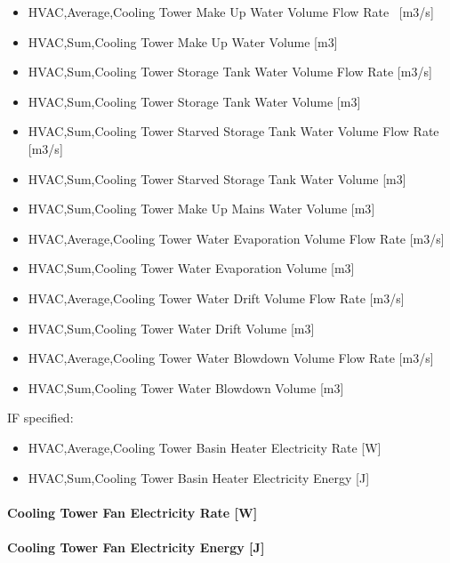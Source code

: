 \begin{itemize}
\item
  HVAC,Average,Cooling Tower Make Up Water Volume Flow Rate~ {[}m3/s{]}
\item
  HVAC,Sum,Cooling Tower Make Up Water Volume {[}m3{]}
\item
  HVAC,Sum,Cooling Tower Storage Tank Water Volume Flow Rate {[}m3/s{]}
\item
  HVAC,Sum,Cooling Tower Storage Tank Water Volume {[}m3{]}
\item
  HVAC,Sum,Cooling Tower Starved Storage Tank Water Volume Flow Rate {[}m3/s{]}
\item
  HVAC,Sum,Cooling Tower Starved Storage Tank Water Volume {[}m3{]}
\item
  HVAC,Sum,Cooling Tower Make Up Mains Water Volume {[}m3{]}
\item
  HVAC,Average,Cooling Tower Water Evaporation Volume Flow Rate {[}m3/s{]}
\item
  HVAC,Sum,Cooling Tower Water Evaporation Volume {[}m3{]}
\item
  HVAC,Average,Cooling Tower Water Drift Volume Flow Rate {[}m3/s{]}
\item
  HVAC,Sum,Cooling Tower Water Drift Volume {[}m3{]}
\item
  HVAC,Average,Cooling Tower Water Blowdown Volume Flow Rate {[}m3/s{]}
\item
  HVAC,Sum,Cooling Tower Water Blowdown Volume {[}m3{]}
\end{itemize}

IF specified:

\begin{itemize}
\item
  HVAC,Average,Cooling Tower Basin Heater Electricity Rate {[}W{]}
\item
  HVAC,Sum,Cooling Tower Basin Heater Electricity Energy {[}J{]}
\end{itemize}

\paragraph{Cooling Tower Fan Electricity Rate {[}W{]}}\label{cooling-tower-fan-electric-power-w}

\paragraph{Cooling Tower Fan Electricity Energy {[}J{]}}\label{cooling-tower-fan-electric-energy-j}

